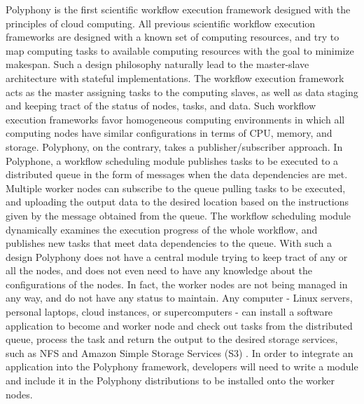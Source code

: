 Polyphony is the first scientific workflow execution framework designed with the principles of cloud computing. All previous scientific workflow execution frameworks are designed with a known set of computing resources, and try to map computing tasks to available computing resources with the goal to minimize makespan. Such a design philosophy naturally lead to the master-slave architecture with stateful implementations. The workflow execution framework acts as the master assigning tasks to the computing slaves, as well as data staging and keeping tract of the status of nodes, tasks, and data. Such workflow execution frameworks favor homogeneous computing environments in which all computing nodes have similar configurations in terms of CPU, memory, and storage. Polyphony, on the contrary, takes a publisher/subscriber approach. In Polyphone, a workflow scheduling module publishes tasks to be executed to a distributed queue in the form of messages when the data dependencies are met. Multiple worker nodes can subscribe to the queue pulling tasks to be executed, and uploading the output data to the desired location based on the instructions given by the message obtained from the queue. The workflow scheduling module dynamically examines the execution progress of the whole workflow, and publishes new tasks that meet data dependencies to the queue. With such a design Polyphony does not have a central module trying to keep tract of any or all the nodes, and does not even need to have any knowledge about the configurations of the nodes. In fact, the worker nodes are not being managed in any way, and do not have any status to maintain. Any computer - Linux servers, personal laptops, cloud instances, or supercomputers - can install a software application to become and worker node and check out tasks from the distributed queue, process the task and return the output to the desired storage services, such as NFS and Amazon Simple Storage Services (S3) . In order to integrate an application into the Polyphony framework, developers will need to write a module and include it in the Polyphony distributions to be installed onto the worker nodes. 


